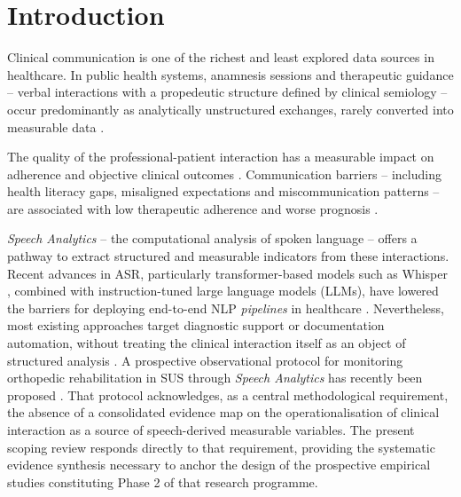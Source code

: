 \documentclass[review,12pt]{elsarticle}
\begin{document}
\section{Introduction}
\label{sec:intro}

Clinical communication is one of the richest and least explored data sources
in healthcare. In public health systems, anamnesis sessions and therapeutic
guidance -- verbal interactions with a propedeutic structure defined
by clinical semiology \citep{Porto2019} -- occur predominantly
as analytically unstructured exchanges, rarely converted into measurable
data \citep{Wang2018,Koleck2019}.

The quality of the professional-patient interaction has a measurable impact
on adherence and objective clinical outcomes \citep{Kelley2014}. Communication
barriers -- including health literacy gaps, misaligned expectations and
miscommunication patterns -- are associated with low therapeutic adherence
and worse prognosis \citep{McCabe2018,Alkhamees2023}.

\textit{Speech Analytics} -- the computational analysis of spoken language --
offers a pathway to extract structured and measurable indicators from these
interactions. Recent advances in ASR, particularly transformer-based models
such as Whisper \citep{Radford2023}, combined with instruction-tuned large
language models (LLMs), have lowered the barriers for deploying end-to-end
NLP \textit{pipelines} in healthcare \citep{Klusty2025}. Nevertheless, most
existing approaches target diagnostic support or documentation automation,
without treating the clinical interaction itself as an object of structured
analysis \citep{vanBuchem2021}. A prospective observational protocol for
monitoring orthopedic rehabilitation in SUS through \textit{Speech
Analytics} has recently been proposed \citep{BaenaNeto2026}. That protocol
acknowledges, as a central methodological requirement, the absence of a
consolidated evidence map on the operationalisation of clinical interaction
as a source of speech-derived measurable variables. The present scoping
review responds directly to that requirement, providing the systematic
evidence synthesis necessary to anchor the design of the prospective
empirical studies constituting Phase 2 of that research programme.
\end{document}
